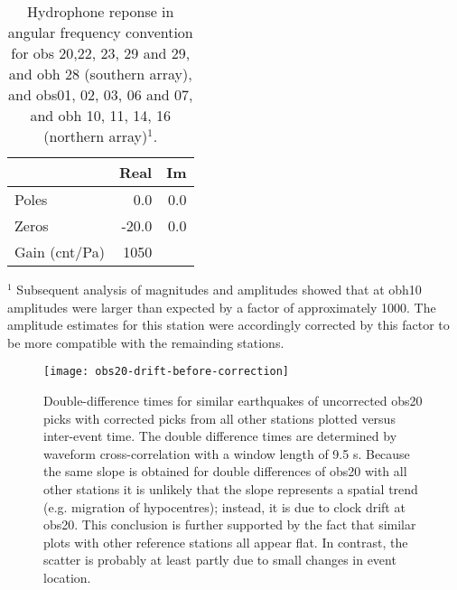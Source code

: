 \documentclass[reviewcopy]{elsart}
\renewcommand{\includegraphics}[2][]{\fbox{#2}}
\begin{document}
\begin{table}
\caption{Hydrophone reponse in angular frequency convention for obs
  20,22, 23, 29 and 29, and obh 28 (southern array), and obs01, 02,
  03, 06 and 07, and obh 10, 11, 14, 16 (northern array)$^1$. }
\label{tbl:hyd-response}
\renewcommand{\baselinestretch}{1.0}
\small
\begin{center}
\begin{tabular}{lrr}
\hline
 & Real  & Im \\
\hline
Poles & 0.0   & 0.0 \\
Zeros & -20.0 & 0.0 \\
Gain (cnt/Pa) & 1050 & \\
\hline
\end{tabular}
\end{center}
\footnotesize
$^1$ Subsequent analysis of magnitudes and amplitudes showed that at obh10 amplitudes
were larger than expected by a factor of approximately 1000.  The
amplitude estimates for this station were accordingly corrected by
this factor to be more compatible with the remainding stations. 
\end{table}


\begin{figure}
\centering
\texttt{[image: obs20-drift-before-correction]}
\caption{Double-difference times for similar earthquakes of uncorrected obs20 picks
with corrected picks from all other stations plotted versus inter-event time. The double difference
times are determined by waveform cross-correlation with a window
length of 9.5 s.  Because 
the same slope is obtained for double differences
of obs20 with all other stations  it is unlikely that the slope
represents a spatial trend (e.g. migration of hypocentres); instead,  it is due to clock
drift at obs20.  This conclusion is further
supported by the fact that similar plots with other reference stations
all appear flat. In contrast, the scatter is probably at least partly due to small changes in event location.}
\label{figa:obs20timing}
\end{figure}
\end{document}
